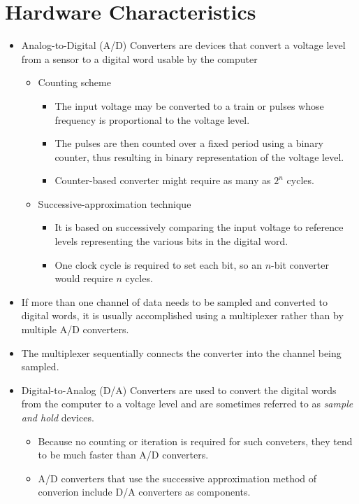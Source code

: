 \documentclass[landscape,14pt]{oblivoir}
\begin{document}
\section{Hardware Characteristics}
%
\begin{itemize}
	\item Analog-to-Digital (A/D) Converters  are devices that convert a voltage level from a sensor to a digital word usable by the computer 
	\begin{itemize}
		\item Counting scheme 
		\begin{itemize}
			\item The input voltage may be converted to a train or pulses whose frequency is proportional to the voltage level.
			\item The pulses are then counted over a fixed period using a binary counter, thus resulting in binary representation of the voltage level. 
			\item Counter-based converter might require as many as $2^n$ cycles. 
		\end{itemize}
		\item Successive-approximation technique 
		\begin{itemize}
			\item It is based on successively comparing the input voltage to reference levels representing the various bits in the digital word. 
			\item One clock cycle is required to set each bit, so an $n$-bit converter would require $n$ cycles. 
		\end{itemize}
	\end{itemize}
	\item If more than one channel of data needs to be sampled and converted to digital words, it is usually accomplished using a multiplexer rather than by multiple A/D converters. 
	\item The multiplexer sequentially connects the converter into the channel being sampled. 
%
\newpage
%
	\item Digital-to-Analog (D/A) Converters  are used to convert the digital words from the computer to a voltage level and are sometimes referred to as \emph{sample and hold} devices. 
	\begin{itemize}
		\item Because no counting or iteration is required for such conveters, they tend to be much faster than A/D converters.
		\item A/D converters that use the successive approximation method of converion include D/A converters as components. 

\end{itemize}
\end{itemize}
\end{document}
